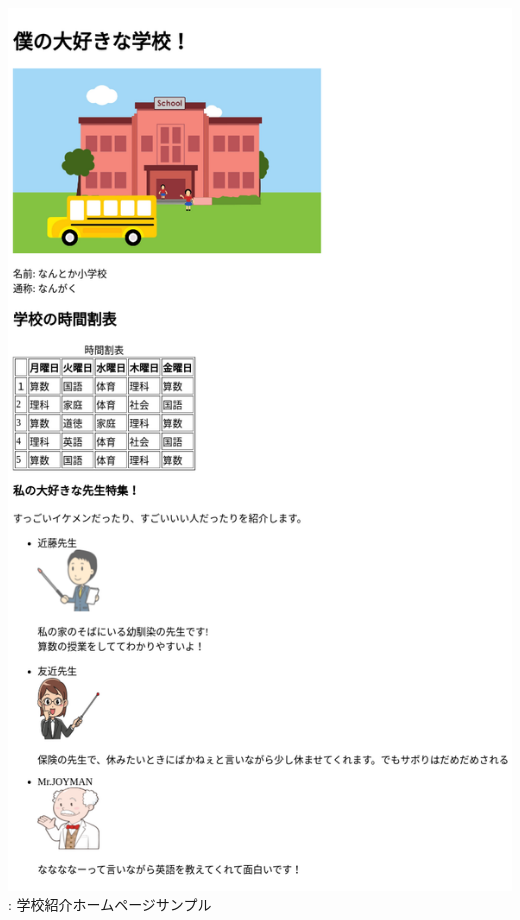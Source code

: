 \documentclass[a4paper,12pt]{jarticle}
\begin{document}
\begin{minipage}{0.45\textwidth}
  {\upshape
    \includegraphics[width=0.9\linewidth]{textbook-img210.png}
    \newline
    {\theFigure\label{seq:refFigure44}}:
    学校紹介ホームページサンプル}
\end{minipage}
\end{document}
